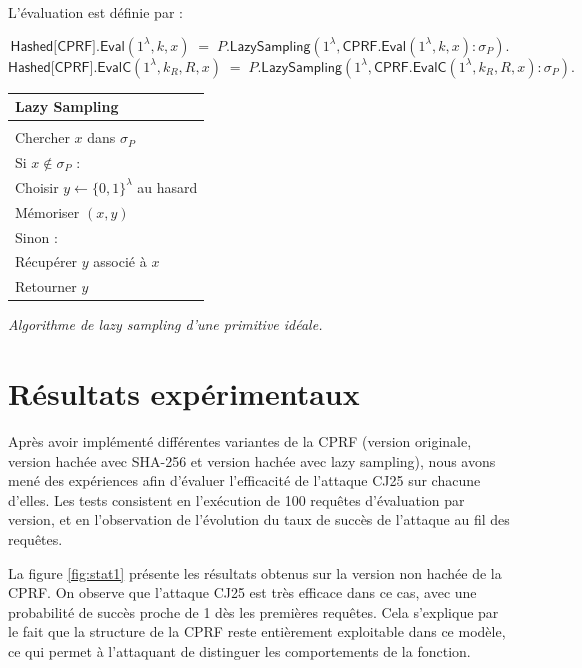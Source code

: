 \documentclass[9pt]{extarticle}
\begin{document}
L'évaluation est définie par :

\[
\textsf{Hashed[CPRF].Eval}(1^\lambda, k, x)
\;=\;
\textsf{$P$.LazySampling}(1^\lambda, \textsf{CPRF.Eval}(1^\lambda, k, x) : \sigma_P).
\]
\[
\textsf{Hashed[CPRF].EvalC}(1^\lambda, k_R, R, x)
\;=\;
\textsf{$P$.LazySampling}(1^\lambda, \textsf{CPRF.EvalC}(1^\lambda, k_R, R, x) : \sigma_P).
\]


\begin{center}
  \begin{tabular}{l}
    \textbf{Lazy Sampling} \\
    \hline \\
    Chercher $x$ dans $\sigma_P$ \\
    Si $x \notin \sigma_P$ : \\
    \quad Choisir $y \leftarrow \{0,1\}^\lambda$ au hasard \\
    \quad Mémoriser $(x,y)$ \\
    Sinon : \\
    \quad Récupérer $y$ associé à $x$ \\
    Retourner $y$
  \end{tabular}
  
  \vspace{1ex}
  \textit{Algorithme de lazy sampling d'une primitive idéale.}
\end{center}




\section{Résultats expérimentaux}

Après avoir implémenté différentes variantes de la CPRF (version originale, version hachée avec SHA-256 et version hachée avec lazy sampling), 
nous avons mené des expériences afin d’évaluer l’efficacité de l’attaque CJ25 sur chacune d’elles. 
Les tests consistent en l’exécution de 100 requêtes d’évaluation par version, et en l’observation de l’évolution du taux de succès de l’attaque au fil des requêtes.

La figure \ref{fig:stat1} présente les résultats obtenus sur la version non hachée de la CPRF. 
On observe que l’attaque CJ25 est très efficace dans ce cas, avec une probabilité de succès proche de 1 dès les premières requêtes. 
Cela s’explique par le fait que la structure de la CPRF reste entièrement exploitable dans ce modèle, ce qui permet à l’attaquant de distinguer les comportements de la fonction.
\end{document}
